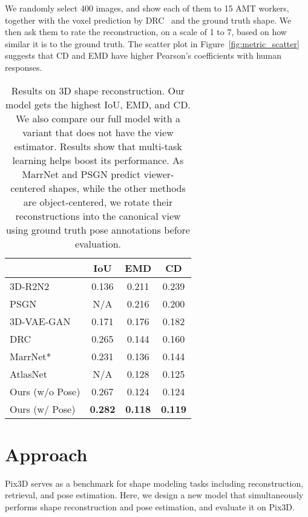 \documentclass[10pt,twocolumn,letterpaper]{article}
\newcommand{\fig}[1]{Figure~\ref{#1}}
\newcommand{\data}{Pix3D\xspace}
\begin{document}
We randomly select 400 images, and show each of them to 15 AMT workers, together with the voxel prediction by DRC~\cite{Tulsiani2017Multi} and the ground truth shape. We then ask them to rate the reconstruction, on a scale of 1 to 7, based on how similar it is to the ground truth. The scatter plot in \fig{fig:metric_scatter} suggests that CD and EMD have higher Pearson's coefficients with human responses.

\begin{table}[t]
    \centering
 	\small
    \begin{tabular}{lccc}
    \toprule
     & IoU & EMD & CD \\
    \midrule
    3D-R2N2~\cite{Choy20163d} & 0.136 & 0.211 & 0.239 \\
    PSGN~\cite{fan2017point} & N/A & 0.216 & 0.200 \\
    3D-VAE-GAN~\cite{Wu2016Learning} & 0.171 & 0.176 & 0.182 \\
    DRC~\cite{Tulsiani2017Multi} & 0.265 & 0.144 & 0.160 \\
    MarrNet*~\cite{marrnet} & 0.231 & 0.136 & 0.144 \\
    AtlasNet~\cite{groueix2018} & N/A & 0.128 & 0.125 \\
    Ours (w/o Pose) & 0.267 & 0.124 & 0.124 \\
    Ours (w/ Pose) & \textbf{0.282} & \textbf{0.118} & \textbf{0.119} \\
    \bottomrule
    \end{tabular}
    \vspace{-5pt}
    \caption{Results on 3D shape reconstruction. Our model gets the highest IoU, EMD, and CD. We also compare our full model with a variant that does not have the view estimator. Results show that multi-task learning helps boost its performance. As MarrNet and PSGN predict viewer-centered shapes, while the other methods are object-centered, we rotate their reconstructions into the canonical view using ground truth pose annotations before evaluation.} 
    \vspace{-15pt}
    \label{tbl:eval_recon}
\end{table}
  \section{Approach}
\label{sec:approach}

\data serves as a benchmark for shape modeling tasks including reconstruction, retrieval, and pose estimation. Here, we design a new model that simultaneously performs shape reconstruction and pose estimation, and evaluate it on \data. 
\end{document}

